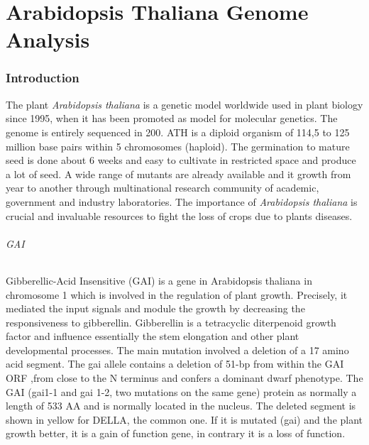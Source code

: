 \documentclass[10pt,a4paper]{article}
\begin{document}
 
 
 
 
 









\newpage
\part*{Arabidopsis Thaliana Genome Analysis}

\section*{Introduction}
The plant \textit{Arabidopsis thaliana} is a genetic model worldwide used in plant biology since 1995, when it has been promoted as model for molecular genetics. The genome is entirely sequenced in 200. ATH is a diploid organism of 114,5 to 125 million base pairs within 5 chromosomes (haploid). The germination to mature seed is done about 6 weeks and easy to cultivate in restricted space and produce a lot of seed. A wide range of mutants are already available and it growth from year to another through multinational research community of academic, government and industry laboratories. The importance of \textit{Arabidopsis thaliana} is crucial and invaluable resources to fight the loss of crops due to plants diseases.


%
%
%


\paragraph{GAI} 

Gibberellic-Acid Insensitive (GAI) is a gene in Arabidopsis thaliana in chromosome 1 
which is involved in the regulation of plant growth.  Precisely, it mediated the input 
signals and module the growth by decreasing the responsiveness to gibberellin\cite{peng_arabidopsis_1997}.
Gibberellin is a tetracyclic diterpenoid growth factor and influence essentially the stem 
elongation and other plant developmental processes\cite{hooley_gibberellins:_nodate}.
The main mutation involved a deletion of a 17 amino acid segment. The gai allele contains
a deletion of 51-bp from within the GAI ORF ,from close to the N terminus and confers a 
dominant dwarf phenotype. The GAI (gai1-1 and gai 1-2, two mutations on the same gene)
protein as normally a length of 533 AA and is normally located in the nucleus. The deleted segment is shown in yellow for DELLA,
the common one\cite{peng_arabidopsis_1997,lee_gibberellin_2002}.
If it is mutated (gai) and the plant growth better, it is a gain of function gene, in contrary it is a loss of function. \\
\end{document}
